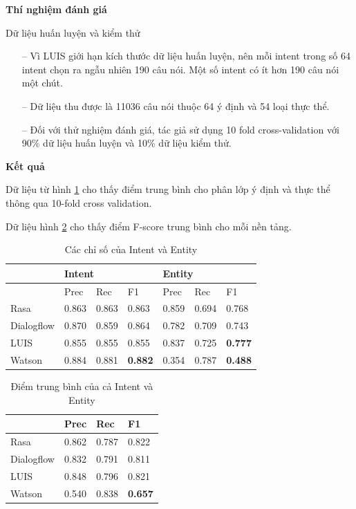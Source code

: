 \textbf{Thí nghiệm đánh giá}

Dữ liệu huấn luyện và kiểm thử
\begin{itemize}
    \item[--] Vì LUIS giới hạn kích thước dữ liệu huấn luyện, nên mỗi intent trong số 64 intent chọn ra ngẫu nhiên 190 câu nói. Một số intent có ít hơn 190 câu nói một chút.
    \item[--] Dữ liệu thu được là 11036 câu nói thuộc 64 ý định và 54 loại thực thể.
    \item[--] Đối với thử nghiệm đánh giá, tác giả sử dụng 10 fold cross-validation với 90\% dữ liệu huấn luyện và 10\% dữ liệu kiểm thử.
\end{itemize}

\textbf{Kết quả}

Dữ liệu từ hình \ref{fig:overallScores4IntentandEntity} cho thấy điểm trung bình cho phân lớp ý định và thực thể thông qua 10-fold cross validation.

Dữ liệu hình \ref{fig:combinedOverallScores} cho thấy điểm F-score trung bình cho mỗi nền tảng.


\begin{table}[]
\begin{center}
\begin{tabular}{|l|l|l|l|l|l|l|}
\hline
\textbf{}  & \multicolumn{3}{l|}{Intent}    & \multicolumn{3}{l|}{Entity}    \\ \hline
\textbf{}  & Prec  & Rec   & F1             & Prec  & Rec   & F1             \\ \hline
Rasa       & 0.863 & 0.863 & 0.863          & 0.859 & 0.694 & 0.768          \\ \hline
Dialogflow & 0.870 & 0.859 & 0.864          & 0.782 & 0.709 & 0.743          \\ \hline
LUIS       & 0.855 & 0.855 & 0.855          & 0.837 & 0.725 & \textbf{0.777} \\ \hline
Watson     & 0.884 & 0.881 & \textbf{0.882} & 0.354 & 0.787 & \textbf{0.488} \\ \hline
\end{tabular}
 \caption{Các chỉ số của Intent và Entity}
    \label{fig:overallScores4IntentandEntity}
    \end{center}
\end{table}



\begin{table}[]
\begin{center}
\begin{tabular}{|l|l|l|l|}
\hline
\textbf{}  & Prec  & Rec   & F1             \\ \hline
Rasa       & 0.862 & 0.787 & 0.822          \\ \hline
Dialogflow & 0.832 & 0.791 & 0.811          \\ \hline
LUIS       & 0.848 & 0.796 & 0.821          \\ \hline
Watson     & 0.540 & 0.838 & \textbf{0.657} \\ \hline
\end{tabular}
    \caption{Điểm trung bình của cả Intent và Entity}
    \label{fig:combinedOverallScores}
    \end{center}
\end{table}

